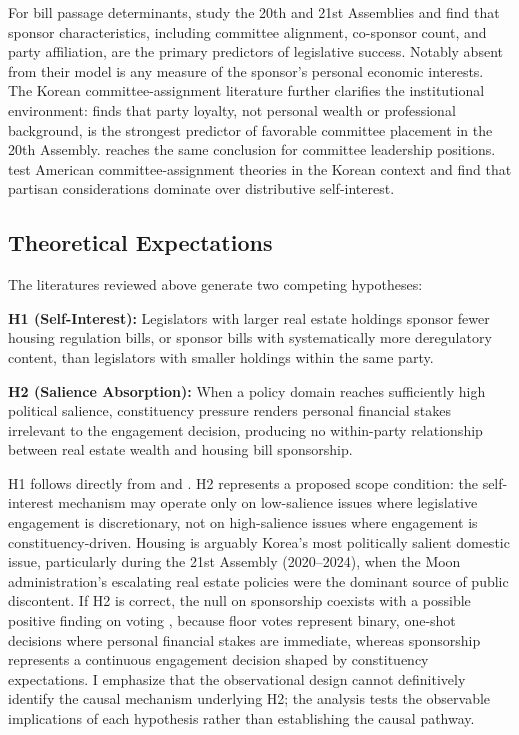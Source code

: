 \documentclass[11pt]{article}
\begin{document}
For bill passage determinants, \citet{anpark2025} study the 20th and 21st Assemblies and find that sponsor characteristics, including committee alignment, co-sponsor count, and party affiliation, are the primary predictors of legislative success. Notably absent from their model is any measure of the sponsor's personal economic interests. The Korean committee-assignment literature further clarifies the institutional environment: \citet{kang2024} finds that party loyalty, not personal wealth or professional background, is the strongest predictor of favorable committee placement in the 20th Assembly. \citet{kang2023} reaches the same conclusion for committee leadership positions. \citet{choikoo2018} test American committee-assignment theories in the Korean context and find that partisan considerations dominate over distributive self-interest.

\subsection{Theoretical Expectations}

The literatures reviewed above generate two competing hypotheses:

\medskip
\noindent \textbf{H1 (Self-Interest):} Legislators with larger real estate holdings sponsor fewer housing regulation bills, or sponsor bills with systematically more deregulatory content, than legislators with smaller holdings within the same party.

\medskip
\noindent \textbf{H2 (Salience Absorption):} When a policy domain reaches sufficiently high political salience, constituency pressure renders personal financial stakes irrelevant to the engagement decision, producing no within-party relationship between real estate wealth and housing bill sponsorship.

\medskip
H1 follows directly from \citet{tahoun2018} and \citet{lupu2015}. H2 represents a proposed scope condition: the self-interest mechanism may operate only on low-salience issues where legislative engagement is discretionary, not on high-salience issues where engagement is constituency-driven. Housing is arguably Korea's most politically salient domestic issue, particularly during the 21st Assembly (2020--2024), when the Moon administration's escalating real estate policies were the dominant source of public discontent. If H2 is correct, the null on sponsorship coexists with a possible positive finding on voting \citep{seo2025}, because floor votes represent binary, one-shot decisions where personal financial stakes are immediate, whereas sponsorship represents a continuous engagement decision shaped by constituency expectations. I emphasize that the observational design cannot definitively identify the causal mechanism underlying H2; the analysis tests the observable implications of each hypothesis rather than establishing the causal pathway.
\end{document}
